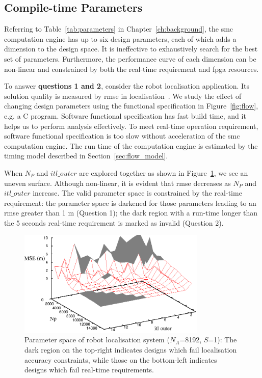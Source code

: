\subsection{Compile-time Parameters}
\label{sec:flow_parameters}

Referring to Table~\ref{tab:parameters} in Chapter~\ref{ch:background}, the \gls{smc} computation engine has up to six design parameters, each of which adds a dimension to the design space.
It is ineffective to exhaustively search for the best set of parameters.
Furthermore, the performance curve of each dimension can be non-linear and constrained by both the real-time requirement and \gls{fpga} resources.

To answer \textbf{questions 1 and 2}, consider the robot localisation application.
Its solution quality is measured by \gls{rmse} in localisation~\cite{montemerlo02}.
We study the effect of changing design parameters using the functional specification in Figure~\ref{fig:flow}, e.g. a C program.
Software functional specification has fast build time, and it helps us to perform analysis effectively.
To meet real-time operation requirement, software functional specification is too slow without acceleration of the \gls{smc} computation engine.
The run time of the computation engine is estimated by the timing model described in Section~\ref{sec:flow_model}.

When $N_P$ and $itl\_outer$ are explored together as shown in Figure~\ref{fig:mcl_2d}, we see an uneven surface.
Although non-linear, it is evident that \gls{rmse} decreases as $N_P$ and $itl\_outer$ increase.
The valid parameter space is constrained by the real-time requirement:
the parameter space is darkened for those parameters leading to an \gls{rmse} greater than 1 m (Question 1);
the dark region with a run-time longer than the 5 seconds real-time requirement is marked as invalid (Question 2).

\begin{figure}[t!]
\begin{center}
\includegraphics[width=0.8\textwidth]{5_tool/figures/fig_mcl_2d}
\end{center}
\caption{Parameter space of robot localisation system ($N_A$=8192, $S$=1): The dark region on the top-right indicates designs which fail localisation accuracy constraints, while those on the bottom-left indicates designs which fail real-time requirements.}
\label{fig:mcl_2d}
\end{figure}

